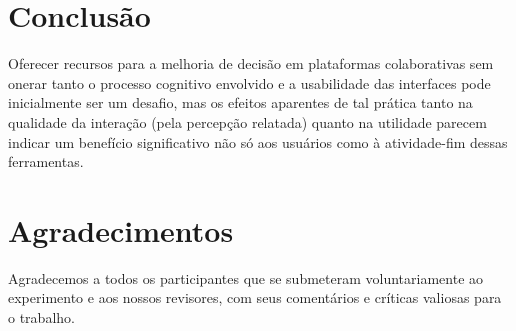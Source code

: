 \documentclass{sigchi}
\begin{document}
\section{Conclusão}
Oferecer recursos para a melhoria de decisão em plataformas colaborativas sem onerar tanto o processo cognitivo envolvido e a usabilidade das interfaces pode inicialmente ser um desafio, mas os efeitos aparentes de tal prática tanto na qualidade da interação (pela percepção relatada) quanto na utilidade parecem indicar um benefício significativo não só aos usuários como à atividade-fim dessas ferramentas.


\section{Agradecimentos}

Agradecemos a todos os participantes que se submeteram voluntariamente ao experimento e aos nossos revisores, com seus comentários e críticas valiosas para o trabalho.


\balance{}


\balance{}



\end{document}
